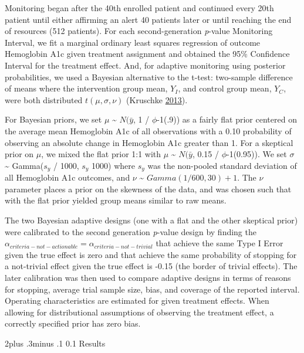 \documentclass[12pt,oneside]{book}
\makeatletter
\newlength{\li}\setlength{\li}{14.48pt}
\newlength{\di}\setlength{\di}{-3.5mm}
\renewcommand\subsection{\@startsection {subsection}{2}{\z@}%
    {2\@bls  plus .3\@bls minus .1\@bls}%
    {0.1\@bls}%
    {\noindent\normalfont}}
\theoremstyle{definition}
\theoremstyle{definition}
\theoremstyle{definition}
\theoremstyle{remark}
\makeatother
\begin{document}
Monitoring began after the 40th enrolled patient and continued every
20th patient until either affirming an alert 40 patients later or until
reaching the end of resources (512 patients). For each second-generation
\emph{p}-value Monitoring Interval, we fit a marginal ordinary least
squares regression of outcome Hemoglobin A1c given treatment assignment
and obtained the 95\% Confidence Interval for the treatment effect. And,
for adaptive monitoring using posterior probabilities, we used a
Bayesian alternative to the t-test: two-sample difference of means where
the intervention group mean, \(Y_I\), and control group mean, \(Y_C\),
were both distributed \(t(\mu, \sigma, \nu)\) (Kruschke
\protect\hyperlink{ref-Kruschke:2013jy}{2013}).

For Bayesian priors, we set \(\mu\) \textasciitilde{} \(N(\bar{y}\), 1 /
\(\phi\)-1(.9)) as a fairly flat prior centered on the average mean
Hemoglobin A1c of all observations with a 0.10 probability of observing
an absolute change in Hemoglobin A1c greater than 1. For a skeptical
prior on \(\mu\), we mixed the flat prior 1:1 with \(\mu\)
\textasciitilde{} \(N(\bar{y}\), 0.15 / \(\phi\)-1(0.95)). We set
\(\sigma\) \textasciitilde{} Gamma(\(s_y\) / 1000, \(s_y\) 1000) where
\(s_y\) was the non-pooled standard deviation of all Hemoglobin A1c
outcomes, and \(\nu\) \textasciitilde{} \(Gamma(1 / 600, 30) + 1\). The
\(\nu\) parameter places a prior on the skewness of the data, and was
chosen such that with the flat prior yielded group means similar to raw
means.

The two Bayesian adaptive designs (one with a flat and the other
skeptical prior) were calibrated to the second generation \emph{p}-value
design by finding the
\(\alpha_{criteria-not-actionable} = \alpha_{criteria-not-trivial}\)
that achieve the same Type I Error given the true effect is zero and
that achieve the same probability of stopping for a not-trivial effect
given the true effect is -0.15 (the border of trivial effects). The
later calibration was then used to compare adaptive designs in terms of
reasons for stopping, average trial sample size, bias, and coverage of
the reported interval. Operating characteristics are estimated for given
treatment effects. When allowing for distributional assumptions of
observing the treatment effect, a correctly specified prior has zero
bias.

\hypertarget{results}{%
\subsection{Results}\label{results}}
\end{document}
